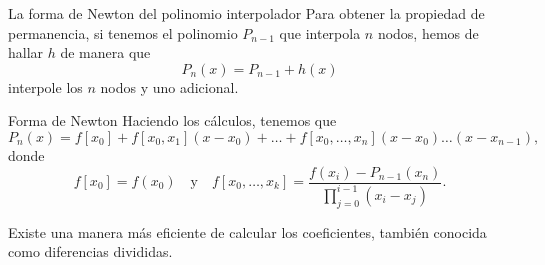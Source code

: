 \begin{frame}{La forma de Newton del polinomio interpolador}
  Para obtener la \alert{propiedad de permanencia}, si tenemos el polinomio
  $P_{n - 1}$ que interpola $n$ nodos, hemos de hallar $h$ de manera que
  \[
    P_n(x) = P_{n - 1} + h(x)
  \]
  interpole los $n$ nodos y uno adicional.

  \begin{exampleblock}{Forma de Newton}
    Haciendo los cálculos, tenemos que
    \[
      P_n(x) = f[x_0] + f[x_0, x_1](x - x_0) + \dots 
      + f[x_0, \dots, x_n](x - x_0) \dots (x - x_{n - 1}),
    \]
    donde
    \[
      f[x_0] = f(x_0)
      \quad \text{y} \quad
      f[x_0, \dots, x_k] =
      \frac{f(x_i) - P_{n - 1}(x_n)}{\prod_{j=0}^{i - 1} (x_i - x_j)}.
    \]
  \end{exampleblock}

  Existe una manera \alert{más eficiente} de calcular los coeficientes,
  también conocida como \alert{diferencias divididas}.
\end{frame}
